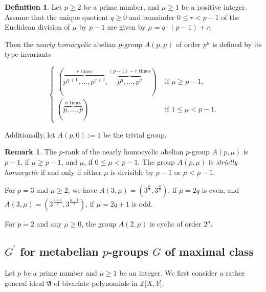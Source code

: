 \documentclass{amsart}
\theoremstyle{definition}
\newtheorem{definition}{Definition}[section]
\newtheorem{remark}{Remark}[section]
\numberwithin{equation}{section}
\begin{document}
\begin{definition}
\label{dfn:NearlyHomocyclic}
Let \(p\ge 2\) be a prime number, and \(\mu\ge 1\) be a positive integer.
Assume that the unique quotient \(q\ge 0\) and remainder \(0\le r<p-1\)
of the Euclidean division of \(\mu\) by \(p-1\) are given by
\(\mu=q\cdot (p-1)+r\).

Then the \textit{nearly homocyclic} abelian \(p\)-group \(A(p,\mu)\) of order \(p^\mu\)
is defined by its type invariants

\begin{equation}
\label{eqn:NearlyHomocyclic}
\begin{cases}
\left(\overbrace{p^{q+1},\ldots,p^{q+1}}^{r \text{ times}},\overbrace{p^q,\ldots,p^q}^{(p-1)-r \text{ times}}\right) & \text{ if } \mu\ge p-1, \\
\left(\overbrace{p,\ldots,p}^{n \text{ times}}\right) & \text{ if } 1\le\mu<p-1.
\end{cases}
\end{equation}

\noindent
Additionally, let \(A(p,0):=1\) be the trivial group.

\end{definition}

\begin{remark}
\label{rmk:NearlyHomocyclic}
The \(p\)-rank of the nearly homocyclic abelian \(p\)-group \(A(p,\mu)\)
is \(p-1\), if \(\mu\ge p-1\), and \(\mu\), if \(0\le\mu<p-1\).
The group \(A(p,\mu)\) is \textit{strictly homocyclic} if and only if
either \(\mu\) is divisible by \(p-1\) or \(\mu<p-1\).

For \(p=3\) and \(\mu\ge 2\), we have
\(A(3,\mu)=\left(3^{\frac{\mu}{2}},3^{\frac{\mu}{2}}\right)\), if \(\mu=2q\) is even, and
\(A(3,\mu)=\left(3^{\frac{\mu+1}{2}},3^{\frac{\mu-1}{2}}\right)\), if \(\mu=2q+1\) is odd.

For \(p=2\) and any \(\mu\ge 0\), the group \(A(2,\mu)\) is cyclic of order \(2^\mu\).
\end{remark}



\subsection{\(G^\prime\) for metabelian \(p\)-groups \(G\) of maximal class}
\label{ss:ComSbgMaxP}

\noindent
Let \(p\) be a prime number and \(\mu\ge 1\) be an integer.
We first consider a rather general ideal \(\mathfrak{A}\) of bivariate polynomials in \(\mathbb{Z}\lbrack X,Y\rbrack\).
\end{document}
